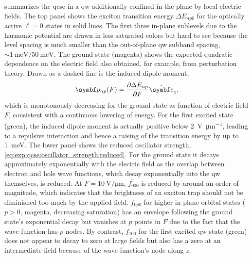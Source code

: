  summarizes the \gls{qcse} in a \gls{qw} additionally confined in the plane by local electric fields.
The top panel shows the exciton transition energy $\Delta E_{np0}$ for the optically active $\ell = 0$ states in solid lines.
The first three in-plane sublevels due to the harmonic potential are drawn in less saturated colors but hard to see because the level spacing is much smaller than the out-of-plane \gls{qw} subband spacing, $\sim\qty{1}{\milli\electronvolt}/\qty{50}{\milli\electronvolt}$.
The ground state (magenta) shows the expected quadratic dependence on the electric field also obtained, for example, from perturbation theory.
Drawn as a dashed line is the induced dipole moment,
\begin{equation}
    \bvec{p}_{np}(F) = \pdv{\Delta E_{np}}{F}\ubvec{z},
\end{equation}
which is monotonously decreasing for the ground state as function of electric field $F$, consistent with a continuous lowering of energy.
For the first excited state (green), the induced dipole moment is actually positive below \qty{2}{\volt\per\micro\meter}, leading to a repulsive interaction and hence a raising of the transition energy by up to \qty{1}{\milli\electronvolt}.
The lower panel shows the reduced oscillator strength, \cref{eq:exp:qcse:oscillator_strength:reduced}.
For the ground state it decays approximately exponentially with the electric field as the overlap between electron and hole wave functions, which decay exponentially into the \gls{qw} themselves, is reduced.
At $F = \qty{10}{\volt\per\micro\meter}$, $\tilde{f_{000}}$ is reduced by around an order of magnitude, which indicates that the brightness of an exciton trap should not be diminished too much by the applied field.
$f_{0p0}$ for higher in-plane orbital states ($p > 0$, magenta, decreasing saturation) has an envelope following the ground state's exponential decay but vanishes at $p$ points in $F$ due to the fact that the wave function has $p$ nodes.
By contrast, $f_{100}$ for the first excited \gls{qw} state (green) does not appear to decay to zero at large fields but also has a zero at an intermediate field because of the wave function's node along $z$.

